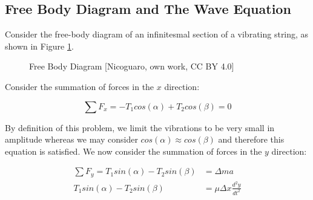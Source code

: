 \documentclass[%
 reprint,
 amsmath,amssymb,
 aps,
]{revtex4-1}
\begin{document}
\subsection{\label{sec:level1}Free Body Diagram and The Wave Equation }

Consider the free-body diagram of an infinitesmal section of a vibrating string, as shown in Figure \ref{freebody}. 


\begin{figure}[h]
\caption{Free Body Diagram [Nicoguaro, own work, CC BY 4.0]}
\label{freebody}
\end{figure}



Consider the summation of forces in the $x$ direction:


\begin{equation}
\sum F_x = -T_1 cos(\alpha) + T_2 cos(\beta) = 0
\end{equation}

By definition of this problem, we limit the vibrations to be very small in amplitude whereas we may consider $cos(\alpha) \approx cos(\beta)$ and therefore this equation is satisfied. We now consider the summation of forces in the $y$ direction:

\begin{align}
\sum F_y = T_1sin(\alpha) - T_2sin(\beta) &= \Delta ma\\
T_1sin(\alpha) - T_2sin(\beta) &= \mu \Delta x \frac{d^2y}{dt^2}
\end{align}
\end{document}
